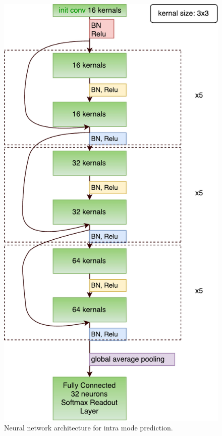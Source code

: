 \begin{figure}
    \centering
    \includegraphics[width=\textwidth,height=\textheight,keepaspectratio]{Figures/our-neural-net-structure.pdf}
    \caption[Neural network architecture for intra mode prediction]{
        Neural network architecture for intra mode prediction.
        }\label{fig:our-architecture}
\end{figure}


